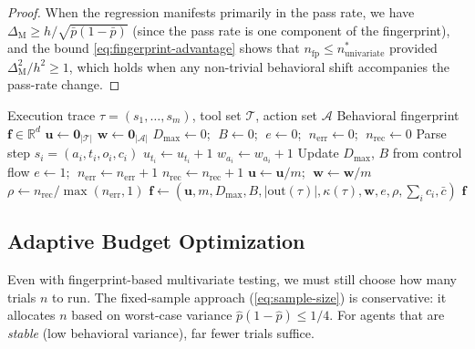 \begin{proof}
When the regression manifests primarily in the pass rate, we have
$\Delta_{\mathrm{M}} \geq h / \sqrt{\bar{p}(1-\bar{p})}$ (since the
pass rate is one component of the fingerprint), and the bound
\eqref{eq:fingerprint-advantage} shows that $n_{\mathrm{fp}} \leq
n^*_{\mathrm{univariate}}$ provided
$\Delta_{\mathrm{M}}^2 / h^2 \geq 1$, which holds when any non-trivial
behavioral shift accompanies the pass-rate change. \qedhere
\end{proof}

\begin{algorithm}[t]
\caption{Behavioral Fingerprint Extraction}
\label{alg:fingerprint}
\begin{algorithmic}[1]
\REQUIRE Execution trace $\tau = (s_1, \ldots, s_m)$, tool set
  $\mathcal{T}$, action set $\mathcal{A}$
\ENSURE Behavioral fingerprint $\mathbf{f} \in \mathbb{R}^d$
\STATE $\mathbf{u} \gets \mathbf{0}_{|\mathcal{T}|}$
\STATE $\mathbf{w} \gets \mathbf{0}_{|\mathcal{A}|}$
\STATE $D_{\max} \gets 0$; $\; B \gets 0$; $\; e \gets 0$;
  $\; n_{\mathrm{err}} \gets 0$; $\; n_{\mathrm{rec}} \gets 0$
  \STATE Parse step $s_i = (a_i, t_i, o_i, c_i)$
    \STATE $u_{t_i} \gets u_{t_i} + 1$
  \ENDIF
  \STATE $w_{a_i} \gets w_{a_i} + 1$
  \STATE Update $D_{\max}$, $B$ from control flow
    \STATE $e \gets 1$; $\; n_{\mathrm{err}} \gets n_{\mathrm{err}} + 1$
      \STATE $n_{\mathrm{rec}} \gets n_{\mathrm{rec}} + 1$
    \ENDIF
  \ENDIF
\ENDFOR
\STATE $\mathbf{u} \gets \mathbf{u} / m$; $\;\mathbf{w} \gets
  \mathbf{w} / m$
\STATE $\rho \gets n_{\mathrm{rec}} / \max(n_{\mathrm{err}}, 1)$
\STATE $\mathbf{f} \gets (\mathbf{u}, m, D_{\max}, B,
  |\mathrm{out}(\tau)|, \kappa(\tau), \mathbf{w}, e, \rho,
  \sum_i c_i, \bar{c})$
\RETURN $\mathbf{f}$
\end{algorithmic}
\end{algorithm}

\subsection{Adaptive Budget Optimization}
\label{sec:token:budget}

Even with fingerprint-based multivariate testing, we must still choose
how many trials $n$ to run. The fixed-sample approach
(\cref{eq:sample-size}) is conservative: it allocates $n$ based on
worst-case variance $\hat{p}(1-\hat{p}) \leq 1/4$. For agents that
are \emph{stable} (low behavioral variance), far fewer trials suffice.

